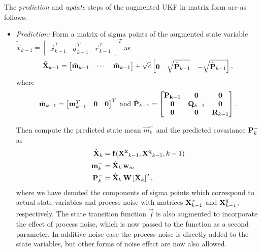 The {\it prediction} and {\it update} steps of the augmented UKF in
matrix form are as follows:
%
\begin{itemize}
\item {\em Prediction:} Form a matrix of sigma points of the augmented
state variable \\$\tilde{\vec{x}}_{k-1} =
\begin{bmatrix} \vec{x}_{k-1}^T & \vec{q}_{k-1}^T & \vec{r}_{k-1}^T
\end{bmatrix}^T$ as
%
\begin{equation}
%
\mat{\tilde{X}}_{k-1} =
   \begin{bmatrix} \tilde{\vec{m}}_{k-1} & \cdots &
\tilde{\vec{m}}_{k-1} \end{bmatrix} + \sqrt{c}
   \begin{bmatrix} \vec{0} & \sqrt{\tilde{\mat{P}}_{k-1}} &
-\sqrt{\tilde{\mat{P}}_{k-1}}
   \end{bmatrix},
%
\label{eq:ukf2_predict1}
\end{equation}
%
where
%
\begin{equation}
%
\tilde{\vec{m}}_{k-1} = \begin{bmatrix} \vec{m}_{k-1}^T & \vec{0} &
\vec{0} \end{bmatrix}^T
%
\text{ and }
%
\tilde{\mat{P}}_{k-1} =
\begin{bmatrix} \mat{P_{k-1}} & \mat{0} & \mat{0} \\ \mat{0} &
\mat{Q}_{k-1} & \mat{0} \\ \mat{0} & \mat{0} & \mat{R}_{k-1} \\
\end{bmatrix}.
%
\label{eq:ukf2_predict2}
\end{equation}

Then compute the predicted state mean $\vec{m}^-_k$ and the predicted
covariance $\mathbf{P}^-_k$ as
%
\begin{equation}
\begin{split} \hat{\mathbf{X}}_{k} &=
\mathbf{f}(\mathbf{X^x}_{k-1},\mathbf{X^q}_{k-1},k-1) \\ \mathbf{m}^-_{k} &=
\hat{\mathbf{X}}_{k} \, \mathbf{w}_m \\ \mathbf{P}^-_{k} &= \hat{\mathbf{X}}_{k}
\, \mathbf{W} \, [ \hat{\mathbf{X}}_{k} ]^T,
\end{split}
\label{eq:ukf2_predict3}
\end{equation}
%
where we have denoted the components of sigma points which correspond
to actual state variables and process noise with matrices
$\mathbf{X}^x_{k-1}$ and $\mathbf{X}^q_{k-1}$, respectively. The state
transition function $\vec{f}$ is also augmented to incorporate the
effect of process noise, which is now passed to the function as a
second parameter. In additive noise case the process noise is directly
added to the state variables, but other forms of noise effect are now
also allowed.


\end{itemize}
